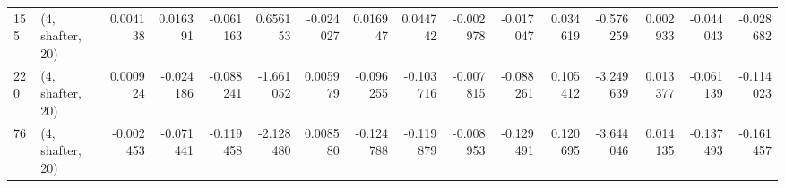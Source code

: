 \begin{tabular}{llrrrrrrrrrrrrrr}
155 &  (4, shafter, 20) &   0.004138 &  0.016391 & -0.061163 &   0.656153 & -0.024027 &   0.016947 &  0.044742 & -0.002978 & -0.017047 &  0.034619 &    -0.576259 &   0.002933 &  -0.044043 &  -0.028682 \\
220 &  (4, shafter, 20) &   0.000924 & -0.024186 & -0.088241 &  -1.661052 &  0.005979 &  -0.096255 & -0.103716 & -0.007815 & -0.088261 &  0.105412 &    -3.249639 &   0.013377 &  -0.061139 &  -0.114023 \\
76  &  (4, shafter, 20) &  -0.002453 & -0.071441 & -0.119458 &  -2.128480 &  0.008580 &  -0.124788 & -0.119879 & -0.008953 & -0.129491 &  0.120695 &    -3.644046 &   0.014135 &  -0.137493 &  -0.161457 \\
\bottomrule
\end{tabular}
